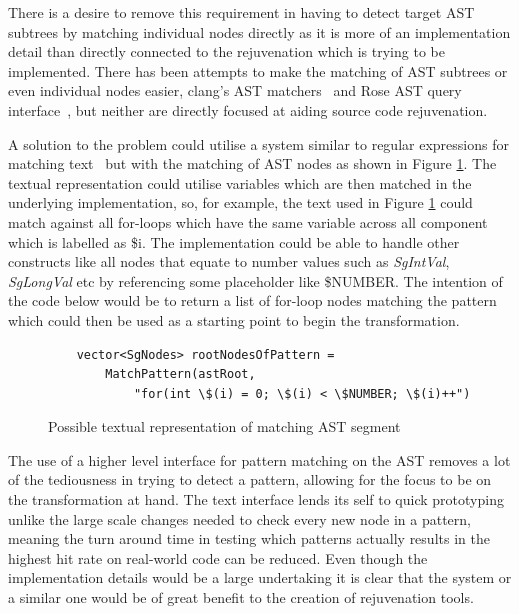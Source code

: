 \documentclass[bsc,frontabs,singlespacing,twoside,parskip,deptreport]{infthesis}
\begin{document}
There is a desire to remove this requirement in having to detect target AST subtrees by matching individual nodes directly as it is more of an implementation detail than directly connected to the rejuvenation which is trying to be implemented. There has been attempts to make the matching of AST subtrees or even individual nodes easier, clang's AST matchers~\cite{CLANG_MATCH_AST} and Rose AST query interface~\cite{ROSE_TUT_AST_QUERY}, but neither are directly focused at aiding source code rejuvenation. 

A solution to the problem could utilise a system similar to regular expressions for matching text~\cite{Aho:1992:FCS:114768} but with the matching of AST nodes as shown in  Figure \ref{fig:adv-ast-matching}. The textual representation could utilise variables which are then matched in the underlying implementation, so, for example, the text used in Figure \ref{fig:adv-ast-matching} could match against all for-loops which have the same variable across all component which is labelled as \$i. The implementation could be able to handle other constructs like all nodes that equate to number values such as \textit{SgIntVal}, \textit{SgLongVal} etc by referencing some placeholder like \$NUMBER. The intention of the code below would be to return a list of for-loop nodes matching the pattern which could then be used as a starting point to begin the transformation.

 \begin{figure}[H]
    \centering
    \begin{verbatim}
    vector<SgNodes> rootNodesOfPattern =
        MatchPattern(astRoot,
            "for(int \$(i) = 0; \$(i) < \$NUMBER; \$(i)++")
    \end{verbatim}
    \caption{Possible textual representation of matching AST segment}
    \label{fig:adv-ast-matching}
\end{figure}
\vspace{-0.5cm}
The use of a higher level interface for pattern matching on the AST removes a lot of the tediousness in trying to detect a pattern, allowing for the focus to be on the transformation at hand. The text interface lends its self to quick prototyping unlike the large scale changes needed to check every new node in a pattern, meaning the turn around time in testing which patterns actually results in the highest hit rate on real-world code can be reduced. Even though the implementation details would be a large undertaking it is clear that the system or a similar one would be of great benefit to the creation of rejuvenation tools.
\end{document}
